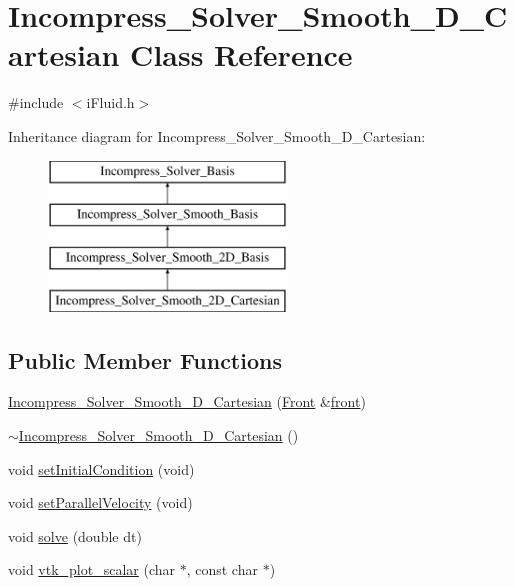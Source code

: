 \hypertarget{class_incompress___solver___smooth__2_d___cartesian}{}\section{Incompress\+\_\+\+Solver\+\_\+\+Smooth\+\_\+D\+\_\+\+Cartesian Class Reference}
\label{class_incompress___solver___smooth__2_d___cartesian}


{\ttfamily \#include $<$i\+Fluid.\+h$>$}

Inheritance diagram for Incompress\+\_\+\+Solver\+\_\+\+Smooth\+\_\+D\+\_\+\+Cartesian\+:\begin{figure}[H]
\begin{center}
\leavevmode
\includegraphics[height=4.000000cm]{df/d04/class_incompress___solver___smooth__2_d___cartesian}
\end{center}
\end{figure}
\subsection*{Public Member Functions}
\begin{DoxyCompactItemize}
\item 
\hyperlink{class_incompress___solver___smooth__2_d___cartesian_abefc6824ea959d3c23c5de452ec6d660}{Incompress\+\_\+\+Solver\+\_\+\+Smooth\+\_\+D\+\_\+\+Cartesian} (\hyperlink{fdecs_8h_ac32202b798f848095c489cfd04c4ca5f}{Front} \&\hyperlink{class_incompress___solver___smooth___basis_ab792d371ca86ec9ed21b4c95d1375a0b}{front})
\item 
\hyperlink{class_incompress___solver___smooth__2_d___cartesian_a9b25f6f30980e088080add667ac6383c}{$\sim$\+Incompress\+\_\+\+Solver\+\_\+\+Smooth\+\_\+D\+\_\+\+Cartesian} ()
\item 
void \hyperlink{class_incompress___solver___smooth__2_d___cartesian_aa4b4f3bf96c6ebb02716ae054ac931dc}{set\+Initial\+Condition} (void)
\item 
void \hyperlink{class_incompress___solver___smooth__2_d___cartesian_ab8a4ef94126e47c674f254c3a82d8f4f}{set\+Parallel\+Velocity} (void)
\item 
void \hyperlink{class_incompress___solver___smooth__2_d___cartesian_af3b2e85b9739122cb610f55641ad13d5}{solve} (double dt)
\item 
void \hyperlink{class_incompress___solver___smooth__2_d___cartesian_a902479c8510fbec7ff0ffe2126b5aef4}{vtk\+\_\+plot\+\_\+scalar} (char $\ast$, const char $\ast$)
\end{DoxyCompactItemize}
